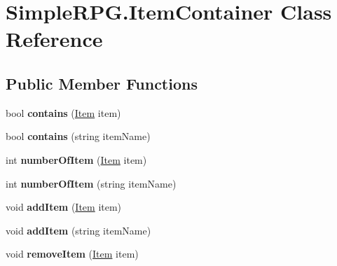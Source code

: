 \hypertarget{class_simple_r_p_g_1_1_item_container}{\section{Simple\+R\+P\+G.\+Item\+Container Class Reference}
\label{class_simple_r_p_g_1_1_item_container}
}
\subsection*{Public Member Functions}
\begin{DoxyCompactItemize}
\item 
\hypertarget{class_simple_r_p_g_1_1_item_container_af7845137ba10a262ec241c5c7d0176b3}{bool {\bfseries contains} (\hyperlink{class_simple_r_p_g_1_1_item}{Item} item)}\label{class_simple_r_p_g_1_1_item_container_af7845137ba10a262ec241c5c7d0176b3}

\item 
\hypertarget{class_simple_r_p_g_1_1_item_container_ac7d2bf711fd35c069ed0c6fca9286186}{bool {\bfseries contains} (string item\+Name)}\label{class_simple_r_p_g_1_1_item_container_ac7d2bf711fd35c069ed0c6fca9286186}

\item 
\hypertarget{class_simple_r_p_g_1_1_item_container_abe794c84a443d0cc5b2a93ca766982f1}{int {\bfseries number\+Of\+Item} (\hyperlink{class_simple_r_p_g_1_1_item}{Item} item)}\label{class_simple_r_p_g_1_1_item_container_abe794c84a443d0cc5b2a93ca766982f1}

\item 
\hypertarget{class_simple_r_p_g_1_1_item_container_af0fceaa5260f3e0e342a9c6ea2dd14b8}{int {\bfseries number\+Of\+Item} (string item\+Name)}\label{class_simple_r_p_g_1_1_item_container_af0fceaa5260f3e0e342a9c6ea2dd14b8}

\item 
\hypertarget{class_simple_r_p_g_1_1_item_container_a83f030ff97e9609c60f46f98ea530acd}{void {\bfseries add\+Item} (\hyperlink{class_simple_r_p_g_1_1_item}{Item} item)}\label{class_simple_r_p_g_1_1_item_container_a83f030ff97e9609c60f46f98ea530acd}

\item 
\hypertarget{class_simple_r_p_g_1_1_item_container_a2ee46a7efb27787692534b528dbb9ae4}{void {\bfseries add\+Item} (string item\+Name)}\label{class_simple_r_p_g_1_1_item_container_a2ee46a7efb27787692534b528dbb9ae4}

\item 
\hypertarget{class_simple_r_p_g_1_1_item_container_adbcd58034e8002b2de9e187a03096d9f}{void {\bfseries remove\+Item} (\hyperlink{class_simple_r_p_g_1_1_item}{Item} item)}\label{class_simple_r_p_g_1_1_item_container_adbcd58034e8002b2de9e187a03096d9f}


\end{DoxyCompactItemize}
